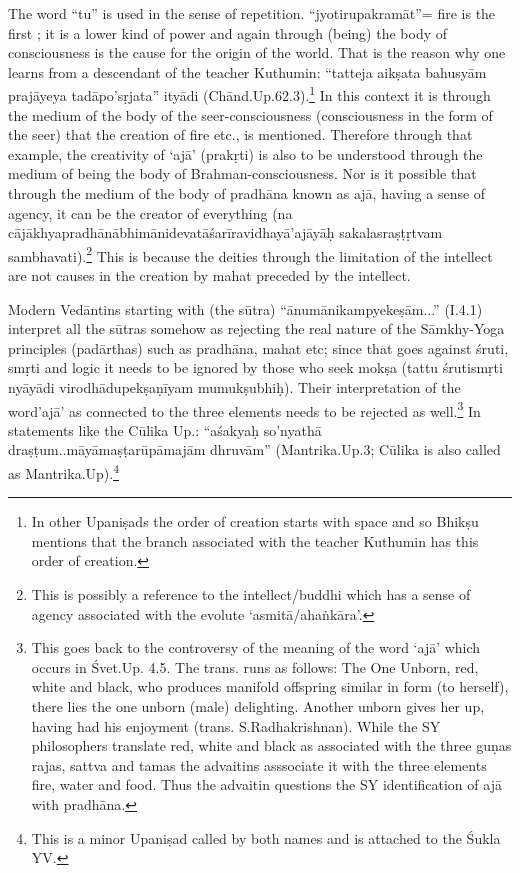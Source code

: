 The word “tu” is used in the sense of repetition. “jyotirupakramāt”= fire is the first ; it is a lower kind of power and again through (being) the body of consciousness is the cause for the origin of the world. That is the reason why one learns from a descendant of the teacher Kuthumin: “tatteja aikṣata bahusyām prajāyeya tadāpo’sṛjata” ityādi (Chānd.Up.62.3).\footnote{In other Upaniṣads the order of creation starts with  space and so Bhikṣu  mentions that the branch associated with the teacher Kuthumin has this order of creation.} In this context it is through the medium of the body of the seer-consciousness (consciousness in the form of the seer) that the creation of fire etc., is mentioned. Therefore through that example, the creativity of ‘ajā’ (prakṛti) is also to be understood through the medium of being the body of Brahman-consciousness.  Nor is it possible that through the medium of the body of pradhāna known as ajā, having a sense of agency, it can be the creator of everything (na cājākhyapradhānābhimānidevatāśarīravidhayā’ajāyāḥ sakalasraṣṭṛtvam sambhavati).\footnote{This is possibly a reference to the intellect/buddhi which has a sense of agency associated with the evolute ‘asmitā/ahaṅkāra’.} This is because the deities through the limitation of the intellect are not causes in the creation by mahat preceded by the intellect.

Modern Vedāntins starting with (the sūtra) “ānumānikampyekeṣām...” (I.4.1)  interpret all the sūtras somehow as rejecting the real nature of the Sāmkhy-Yoga principles (padārthas) such as pradhāna, mahat etc; since that goes against śruti, smṛti and logic it needs to be ignored by those who seek mokṣa (tattu śrutismṛti nyāyādi virodhādupekṣaṇī\-yam mumukṣubhiḥ). Their interpretation of the word’ajā’ as connected to the three elements needs to be rejected as well.\footnote{This goes back to the controversy of the meaning of the word ‘ajā’ which occurs in Śvet.Up. 4.5. The trans. runs as follows: The One Unborn, red, white and black, who produces manifold offspring similar in form (to herself), there lies the one unborn (male) delighting. Another unborn gives her up, having had his enjoyment (trans. S.Radhakrishnan). While the SY philosophers translate red, white and black as associated with the three guṇas rajas, sattva and tamas the advaitins asssociate it with the three elements fire, water and food. Thus the advaitin questions the SY identification of ajā with pradhāna.} In statements like the Cūlika Up.: “aśakyaḥ so’nyathā draṣṭum..māyāmaṣṭarūpāmajām dhruvām” (Mantrika.Up.3; Cūlika is also called as Mantrika.Up).\footnote{This is a minor Upaniṣad called by both names and is attached to the Śukla YV.}

